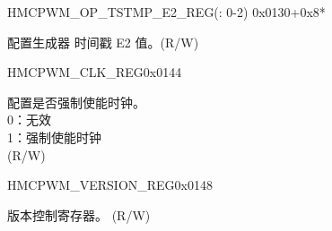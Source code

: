 \begin{register}{H}{MCPWM\_OP\_TSTMP\_E2\_REG(: 0-2)}
{0x0130+0x8*}\label{regdesc:MCPWMOPNTSTMPE2REG}
%
%
\regnewline%
\begin{regdesc}\begin{reglist}
\label{fielddesc:MCPWMOPNTSTMPE2}\item [MCPWM\_OP\regindex{n}\_TSTMP\_E2] 配置生成器 时间戳 E2 值。(R/W)
\end{reglist}\end{regdesc}
\end{register}


\begin{register}{H}{MCPWM\_CLK\_REG}{0x0144}\label{regdesc:MCPWMCLKREG}
%
%
\regnewline%
\begin{regdesc}\begin{reglist}
\label{fielddesc:MCPWMCLKEN}\item [MCPWM\_CLK\_EN] 配置是否强制使能时钟。\\
0：无效 \\
1：强制使能时钟 \\
(R/W)
\end{reglist}\end{regdesc}
\end{register}


\begin{register}{H}{MCPWM\_VERSION\_REG}{0x0148}\label{regdesc:MCPWMVERSIONREG}
%
%
%
\regnewline%
\begin{regdesc}\begin{reglist}
\label{fielddesc:MCPWMDATE}\item [MCPWM\_DATE] 版本控制寄存器。 (R/W)
\end{reglist}\end{regdesc}
\end{register}



